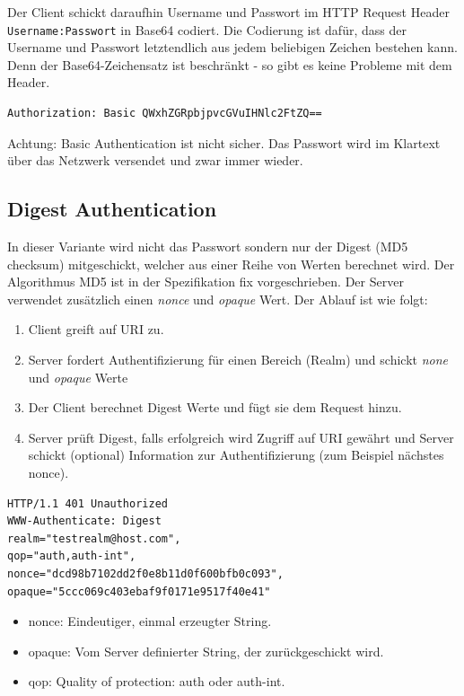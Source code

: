 Der Client schickt daraufhin Username und Passwort im HTTP Request Header \verb|Username:Passwort| in Base64 codiert. Die Codierung ist dafür, dass der Username und Passwort letztendlich aus jedem beliebigen Zeichen bestehen kann. Denn der Base64-Zeichensatz ist beschränkt - so gibt es keine Probleme mit dem Header.

\begin{lstlisting}[caption=HTTP Request Header]
Authorization: Basic QWxhZGRpbjpvcGVuIHNlc2FtZQ==
\end{lstlisting}

Achtung: Basic Authentication ist nicht sicher. Das Passwort wird im Klartext über das Netzwerk versendet und zwar immer wieder.

\subsection{Digest Authentication}

In dieser Variante wird nicht das Passwort sondern nur der Digest (MD5 checksum) mitgeschickt, welcher aus einer Reihe von Werten berechnet wird. Der Algorithmus MD5 ist in der Spezifikation fix vorgeschrieben. Der Server verwendet zusätzlich einen \textit{nonce} und \textit{opaque} Wert. Der Ablauf ist wie folgt:

\begin{enumerate}
	\item Client greift auf URI zu.
	\item Server fordert Authentifizierung für einen Bereich (Realm) und schickt \textit{none} und \textit{opaque} Werte
	\item Der Client berechnet Digest Werte und fügt sie dem Request hinzu.
	\item Server prüft Digest, falls erfolgreich wird Zugriff auf
	URI gewährt und Server schickt (optional) Information
	zur Authentifizierung (zum Beispiel nächstes nonce).
\end{enumerate}

\begin{lstlisting}[caption=HTTP Response Header]
HTTP/1.1 401 Unauthorized
WWW-Authenticate: Digest
realm="testrealm@host.com",
qop="auth,auth-int",
nonce="dcd98b7102dd2f0e8b11d0f600bfb0c093",
opaque="5ccc069c403ebaf9f0171e9517f40e41"
\end{lstlisting}

\begin{itemize}
	\item nonce: Eindeutiger, einmal erzeugter String.
	\item opaque: Vom Server definierter String, der zurückgeschickt wird.
	\item qop: Quality of protection: auth oder auth-int.
\end{itemize}

